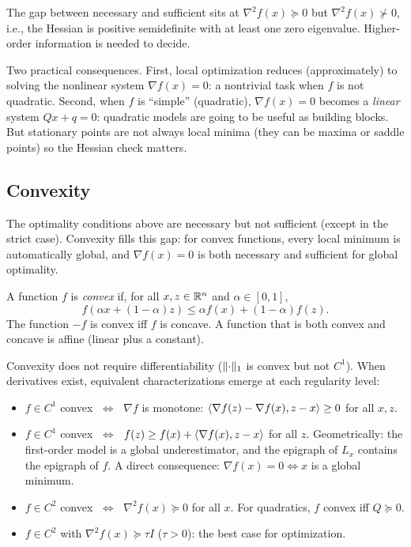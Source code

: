 The gap between necessary and sufficient sits at $\nabla^2 f(x) \succeq 0$ but $\nabla^2 f(x) \not\succ 0$, i.e., the Hessian is positive semidefinite with at least one zero eigenvalue.
Higher-order information is needed to decide.

Two practical consequences.
First, local optimization reduces (approximately) to solving the nonlinear system $\nabla f(x) = 0$: a nontrivial task when $f$ is not quadratic.
Second, when $f$ is ``simple'' (quadratic), $\nabla f(x) = 0$ becomes a \emph{linear} system $Qx + q = 0$: quadratic models are going to be useful as building blocks.
But stationary points are not always local minima (they can be maxima or saddle points) so the Hessian check matters.


\subsection{Convexity}\label{sec:convexity}

The optimality conditions above are necessary but not sufficient (except in the strict case).
Convexity fills this gap: for convex functions, every local minimum is automatically global, and $\nabla f(x) = 0$ is both necessary and sufficient for global optimality.

\begin{definition}\label{def:convex}
	A function $f$ is \emph{convex} if, for all $x, z \in \mathbb{R}^n$ and $\alpha \in [0,1]$,
	\begin{equation}\label{eq:convexity}
		f(\alpha x + (1 - \alpha) z) \leq \alpha f(x) + (1 - \alpha) f(z).
	\end{equation}
	The function $-f$ is convex iff $f$ is concave.
	A function that is both convex and concave is affine (linear plus a constant).
\end{definition}

Convexity does not require differentiability ($\lVert\cdot\rVert_1$ is convex but not $C^1$).
When derivatives exist, equivalent characterizations emerge at each regularity level:

\begin{itemize}
	\item $f \in C^1$ convex $\;\Leftrightarrow\;$ $\nabla f$ is monotone: $\langle\nabla f(z) - \nabla f(x), z - x\rangle \geq 0$ for all $x, z$.
	\item $f \in C^1$ convex $\;\Leftrightarrow\;$ $f(z) \geq f(x) + \langle\nabla f(x), z - x\rangle$ for all $z$.
		Geometrically: the first-order model is a global underestimator, and the epigraph of $L_x$ contains the epigraph of $f$.
		A direct consequence: $\nabla f(x) = 0 \Leftrightarrow x$ is a global minimum.
	\item $f \in C^2$ convex $\;\Leftrightarrow\;$ $\nabla^2 f(x) \succeq 0$ for all $x$.
		For quadratics, $f$ convex iff $Q \succeq 0$.
	\item $f \in C^2$ with $\nabla^2 f(x) \succeq \tau I$ ($\tau > 0$): the best case for optimization.
\end{itemize}

